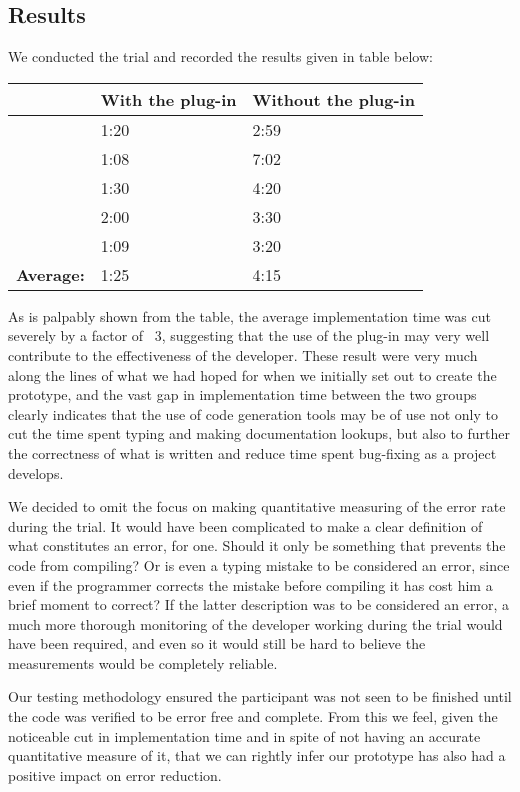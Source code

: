 \subsection{Results}
\label{Results}
We conducted the trial and recorded the results given in table below:

\begin{center}
\begin{tabular}{|l|l|l|}
    \hline
    ~        & {\bf With the plug-in} & {\bf Without the plug-in} \\ \hline
    ~        & 1:20             & 2:59                \\ \hline
    ~        & 1:08             & 7:02                \\ \hline
    ~        & 1:30             & 4:20                \\ \hline
    ~        & 2:00             & 3:30                \\ \hline
    ~        & 1:09             & 3:20                   \\ \hline
    {\bf Average:} & 1:25             & 4:15                \\ \hline
\end{tabular}
\end{center}

As is palpably shown from the table, the average implementation time was cut severely by a factor of ~3, suggesting that the use of the plug-in may very well contribute to the effectiveness of the developer. These result were very much along the lines of what we had hoped for when we initially set out to create the prototype, and the vast gap in implementation time between the two groups clearly indicates that the use of code generation tools may be of use not only to cut the time spent typing and making documentation lookups, but also to further the correctness of what is written and reduce time spent bug-fixing as a project develops.

We decided to omit the focus on making quantitative measuring of the error rate during the trial. It would have been complicated to make a clear definition of what constitutes an error, for one. Should it only be something that prevents the code from compiling? Or is even a typing mistake to be considered an error, since even if the programmer corrects the mistake before compiling it has cost him a brief moment to correct? If the latter description was to be considered an error, a much more thorough monitoring of the developer working during the trial would have been required, and even so it would still be hard to believe the measurements would be completely reliable.

Our testing methodology ensured the participant was not seen to be finished until the code was verified to be error free and complete. From this we feel, given the noticeable cut in implementation time and in spite of not having an accurate quantitative measure of it, that we can rightly infer our prototype has also had a positive impact on error reduction.  








